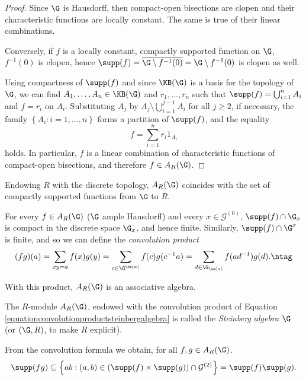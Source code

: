 \begin{proof}
Since $\G$ is Hausdorff, then compact-open bisections are clopen and their characteristic functions are locally constant. The same is true of their linear combinations.

Conversely, if $f$ is a locally constant, compactly supported function on $\G$, $f^{-1}(0)$ is clopen, hence $\supp(f)=\overline{\G\setminus f^{-1}(0)}=\G\setminus f^{-1}(0)$ is clopen as well.

Using compactness of $\supp(f)$ and since $\KB(\G)$ is a basis for the topology of $\G$, we can find $A_1,\ldots,A_n\in\KB(\G)$ and $r_1,\ldots,r_n$ such that $\supp(f)=\bigcup_{i=1}^n A_i$ and $f=r_i$ on $A_i$. Substituting $A_j$ by $A_j\setminus\bigcup_{i=1}^{j-1}A_i$ for all $j\geq 2$, if necessary, the family $\left\{A_i:i=1,\ldots,n\right\}$ forms a partition of $\supp(f)$, and the equality
\[f=\sum_{i=1}^n r_i1_{A_i}\]
holds. In particular, $f$ is a linear combination of characteristic functions of compact-open bisections, and therefore $f\in A_R(\G)$.\qedhere
\end{proof}

\begin{remarkn}
Endowing $R$ with the discrete topology, $A_R(\G)$ coincides with the set of compactly supported functions from $\G$ to $R$.
\end{remarkn}

For every $f\in A_R(\G)$ ($\G$ ample Hausdorff) and every $x\in\mathcal{G}^{(0)}$, $\supp(f)\cap\G_x$ is compact in the discrete space $\G_x$, and hence finite. Similarly, $\supp(f)\cap \G^x$ is finite, and so we can define the \emph{convolution product}
\[(fg)(a)=\sum_{xy=a}f(x)g(y)=\sum_{c\in\G^{\ra(a)}}f(c)g(c^{-1}a)=\sum_{d\in\G_{\so(a)}}f(ad^{-1})g(d).\ntag\label{equationconvolutionproductsteinbergalgebra}\]

With this product, $A_R(\G)$ is an associative algebra.

\begin{definition}[{\cite{MR2565546,MR3274831}}]
The $R$-module $A_R(\G)$, endowed with the convolution product of Equation \ref{equationconvolutionproductsteinbergalgebra} is called the \emph{Steinberg algebra} $\G$ (or $(\G,R)$, to make $R$ explicit).
\end{definition}

From the convolution formula we obtain, for all $f,g\in A_R(\G)$.
\[\supp(fg)\subseteq\left\{ab:(a,b)\in(\supp(f)\times\supp(g))\cap\mathcal{G}^{(2)}\right\}=\supp(f)\supp(g).\]

